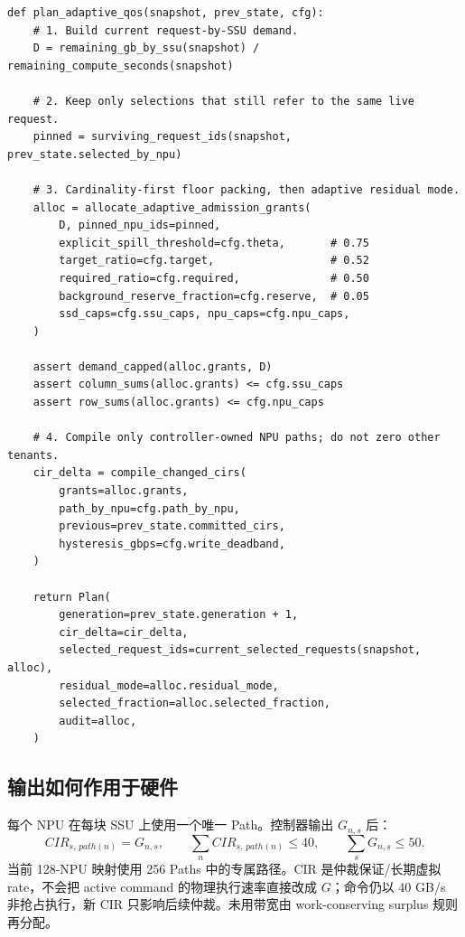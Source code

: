 \documentclass[UTF8,fontset=none,10pt,a4paper]{ctexart}
\begin{document}
\begin{lstlisting}[style=modernpython]
def plan_adaptive_qos(snapshot, prev_state, cfg):
    # 1. Build current request-by-SSU demand.
    D = remaining_gb_by_ssu(snapshot) / remaining_compute_seconds(snapshot)

    # 2. Keep only selections that still refer to the same live request.
    pinned = surviving_request_ids(snapshot, prev_state.selected_by_npu)

    # 3. Cardinality-first floor packing, then adaptive residual mode.
    alloc = allocate_adaptive_admission_grants(
        D, pinned_npu_ids=pinned,
        explicit_spill_threshold=cfg.theta,       # 0.75
        target_ratio=cfg.target,                  # 0.52
        required_ratio=cfg.required,              # 0.50
        background_reserve_fraction=cfg.reserve,  # 0.05
        ssd_caps=cfg.ssu_caps, npu_caps=cfg.npu_caps,
    )

    assert demand_capped(alloc.grants, D)
    assert column_sums(alloc.grants) <= cfg.ssu_caps
    assert row_sums(alloc.grants) <= cfg.npu_caps

    # 4. Compile only controller-owned NPU paths; do not zero other tenants.
    cir_delta = compile_changed_cirs(
        grants=alloc.grants,
        path_by_npu=cfg.path_by_npu,
        previous=prev_state.committed_cirs,
        hysteresis_gbps=cfg.write_deadband,
    )

    return Plan(
        generation=prev_state.generation + 1,
        cir_delta=cir_delta,
        selected_request_ids=current_selected_requests(snapshot, alloc),
        residual_mode=alloc.residual_mode,
        selected_fraction=alloc.selected_fraction,
        audit=alloc,
    )
\end{lstlisting}

\subsection{输出如何作用于硬件}

每个 NPU 在每块 SSU 上使用一个唯一 Path。控制器输出 $G_{n,s}$ 后：
\begin{equation}
  CIR_{s,\,path(n)}=G_{n,s},\qquad
  \sum_n CIR_{s,\,path(n)}\le 40,\qquad
  \sum_s G_{n,s}\le 50.
\end{equation}
当前 128-NPU 映射使用 256 Paths 中的专属路径。CIR 是仲裁保证/长期虚拟 rate，不会把
active command 的物理执行速率直接改成 $G$；命令仍以 40 GB/s 非抢占执行，新 CIR
只影响后续仲裁。未用带宽由 work-conserving surplus 规则再分配。
\end{document}
